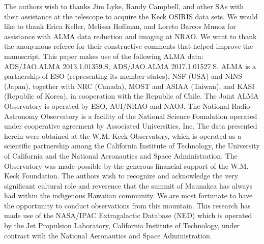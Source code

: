\documentclass[twocolumn]{aastex63}
\begin{document}
\acknowledgments
The authors wish to thanks Jim Lyke, Randy Campbell, and other SAs with their assistance at the telescope to acquire the Keck OSIRIS data sets. We would like to thank Erica Keller, Melissa Hoffman, and Loreto Barcos Munoz for assistance with ALMA data reduction and imaging at NRAO. We want to thank the anonymous referee for their constructive comments that helped improve the manuscript. This paper makes use of the following ALMA data: ADS/JAO.ALMA 2013.1.01359.S, ADS/JAO.ALMA 2017.1.01527.S. ALMA is a partnership of ESO (representing its member states), NSF (USA) and NINS (Japan), together with NRC (Canada), MOST and ASIAA (Taiwan), and KASI (Republic of Korea), in cooperation with the Republic of Chile. The Joint ALMA Observatory is operated by ESO, AUI/NRAO and NAOJ. The National Radio Astronomy Observatory is a facility of the National Science Foundation operated under cooperative agreement by Associated Universities, Inc. The data presented herein were obtained at the W.M. Keck Observatory, which is operated as a scientific partnership among the California Institute of Technology, the University of California and the National Aeronautics and Space Administration. The Observatory was made possible by the generous financial support of the W.M. Keck Foundation. The authors wish to recognize and acknowledge the very significant cultural role and reverence that the summit of Maunakea has always had within the indigenous Hawaiian community. We are most fortunate to have the opportunity to conduct observations from this mountain. This research has made use of the NASA/IPAC Extragalactic Database (NED) which is operated by the Jet Propulsion Laboratory, California Institute of Technology, under contract with the National Aeronautics and Space Administration.

\end{document}
